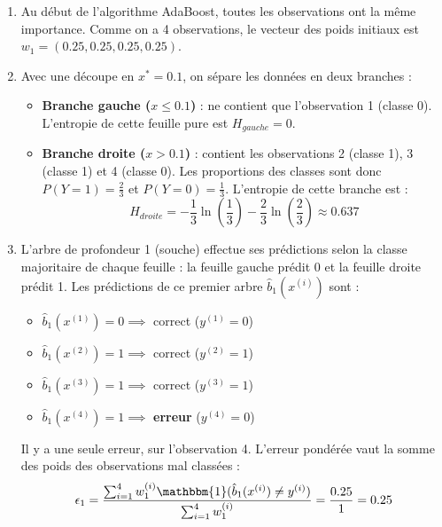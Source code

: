 \documentclass[solutions]{../exercices}
\begin{document}
\begin{solution}
\begin{enumerate}
    \item Au début de l'algorithme AdaBoost, toutes les observations ont la même importance. Comme on a 4 observations, le vecteur des poids initiaux est $w_1 = (0.25, 0.25, 0.25, 0.25)$.

    \item Avec une découpe en $x^* = 0.1$, on sépare les données en deux branches :
    \begin{itemize}
        \item \textbf{Branche gauche ($x \leq 0.1$)} : ne contient que l'observation 1 (classe 0). L'entropie de cette feuille pure est $H_{gauche} = 0$.
        \item \textbf{Branche droite ($x > 0.1$)} : contient les observations 2 (classe 1), 3 (classe 1) et 4 (classe 0). Les proportions des classes sont donc $P(Y=1) = \frac{2}{3}$ et $P(Y=0) = \frac{1}{3}$.
        L'entropie de cette branche est :
        \begin{equation*}
            H_{droite} = - \frac{1}{3} \ln\left(\frac{1}{3}\right) - \frac{2}{3} \ln\left(\frac{2}{3}\right) \approx 0.637
        \end{equation*}
    \end{itemize}
    \item L'arbre de profondeur 1 (souche) effectue ses prédictions selon la classe majoritaire de chaque feuille : la feuille gauche prédit 0 et la feuille droite prédit 1.
    Les prédictions de ce premier arbre $\hat{b}_1(x^{(i)})$ sont :
    \begin{itemize}
        \item $\hat{b}_1(x^{(1)}) = 0 \implies$ correct ($y^{(1)}=0$)
        \item $\hat{b}_1(x^{(2)}) = 1 \implies$ correct ($y^{(2)}=1$)
        \item $\hat{b}_1(x^{(3)}) = 1 \implies$ correct ($y^{(3)}=1$)
        \item $\hat{b}_1(x^{(4)}) = 1 \implies$ \textbf{erreur} ($y^{(4)}=0$)
    \end{itemize}
    Il y a une seule erreur, sur l'observation 4. L'erreur pondérée vaut la somme des poids des observations mal classées :
    \begin{equation*}
        \epsilon_1 = \frac{\sum_{i=1}^4 w_1^{(i)} \mathbbm{1}(\hat{b}_1(x^{(i)}) \neq y^{(i)})}{\sum_{i=1}^4 w_1^{(i)}} = \frac{0.25}{1} = 0.25
    \end{equation*}

\end{enumerate}
\end{solution}
\end{document}
